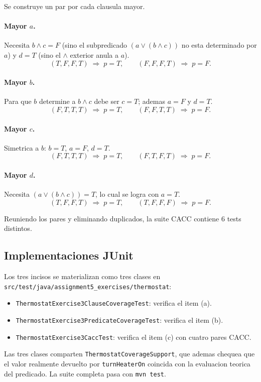 \documentclass[12pt,a4paper]{article}
\begin{document}
Se construye un par por cada clausula mayor.

\paragraph{Mayor $a$.} Necesita $b \wedge c = F$ (sino el subpredicado $(a \vee (b \wedge c))$
no esta determinado por $a$) y $d = T$ (sino el $\wedge$ exterior anula a $a$).
\[
(T,F,F,T) \;\Rightarrow\; p=T, \qquad (F,F,F,T) \;\Rightarrow\; p=F.
\]

\paragraph{Mayor $b$.} Para que $b$ determine a $b \wedge c$ debe ser $c=T$; ademas
$a=F$ y $d=T$.
\[
(F,T,T,T) \;\Rightarrow\; p=T, \qquad (F,F,T,T) \;\Rightarrow\; p=F.
\]

\paragraph{Mayor $c$.} Simetrica a $b$: $b=T$, $a=F$, $d=T$.
\[
(F,T,T,T) \;\Rightarrow\; p=T, \qquad (F,T,F,T) \;\Rightarrow\; p=F.
\]

\paragraph{Mayor $d$.} Necesita $(a \vee (b\wedge c)) = T$, lo cual se logra con $a=T$.
\[
(T,F,F,T) \;\Rightarrow\; p=T, \qquad (T,F,F,F) \;\Rightarrow\; p=F.
\]

Reuniendo los pares y eliminando duplicados, la suite CACC contiene 6 tests distintos.

\subsection{Implementaciones JUnit}

Los tres incisos se materializan como tres clases en
\texttt{src/test/java/assignment5\_exercises/thermostat}:
\begin{itemize}
  \item \texttt{ThermostatExercise3ClauseCoverageTest}: verifica el item (a).
  \item \texttt{ThermostatExercise3PredicateCoverageTest}: verifica el item (b).
  \item \texttt{ThermostatExercise3CaccTest}: verifica el item (c) con cuatro pares CACC.
\end{itemize}
Las tres clases comparten \texttt{ThermostatCoverageSupport}, que ademas chequea que el valor
realmente devuelto por \texttt{turnHeaterOn} coincida con la evaluacion teorica del predicado.
La suite completa pasa con \texttt{mvn test}.
\end{document}
